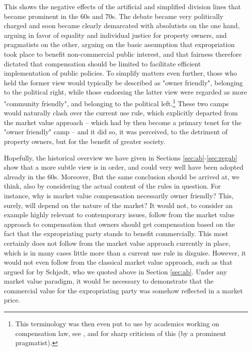 \documentclass[10pt]{article} %
\begin{document}
This shows the negative effects of the artificial and simplified division lines that became prominent in the 60s and 70s. The debate became very politically charged and soon became clearly demarcated with absolutists on the one hand, arguing in favor of equality and individual justice for property owners, and pragmatists on the other, arguing on the basic assumption that expropriation took place to benefit non-commercial public interest, and that fairness therefore dictated that compensation should be limited to facilitate efficient implementation of public policies. To simplify matters even further, those who held the former view would typically be described as "owner friendly", belonging to the political right, while those endorsing the latter view were regarded as more "community friendly", and belonging to the political left.\footnote{This terminology was then even put to use by academics working on compensation law, see \cite{stor}, and \cite{regeksp} for sharp criticism of this (by a prominent pragmatist).} These two camps would naturally clash over the current use rule, which explicitly departed from the market value approach -- which had by then become a primary tenet for the "owner friendly" camp -- and it did so, it was perceived, to the detriment of property owners, but for the benefit of greater society.

Hopefully, the historical overview we have given in Sections \ref{sec:ab}-\ref{sec:regab} show that a more subtle view is in order, and could very well have been adopted already in the 60s. Moreover, But the same conclusion should be arrived at, we think, also by considering the actual content of the rules in question. For instance, why is  market value compensation necessarily owner friendly? This, surely, will depend on the nature of the market? It would not, to consider an example highly relevant to contemporary issues, follow from the market value approach to compensation that owners should get compensation based on the fact that the expropriating party stands to benefit commercially. This most certainly does not follow from the market value approach currently in place, which is in many cases little more than a current use rule in disguise. However, it would not even follow from the classical market value approach, such as that argued for by Schjødt, who we quoted above in Section \ref{sec:ab}. Under any market value paradigm, it would be necessary to demonstrate that the commercial value for the expropriating party was somehow reflected in a market price. 
\end{document}
